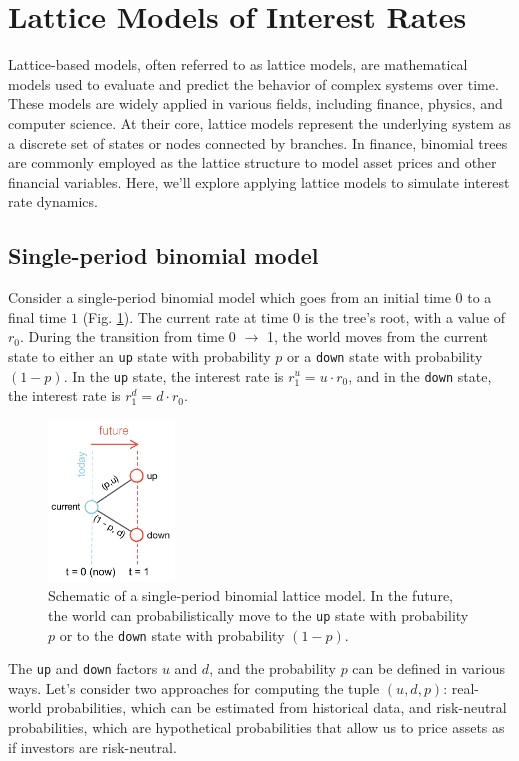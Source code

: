 \documentclass[11pt]{article}
\theoremstyle{definition}
\begin{document}
\clearpage

\section{Lattice Models of Interest Rates}
Lattice-based models, often referred to as lattice models, are mathematical models used to evaluate and predict the behavior of complex systems over time. 
These models are widely applied in various fields, including finance, physics, and computer science. 
At their core, lattice models represent the underlying system as a discrete set of states or nodes connected by branches. In finance, binomial trees are commonly employed as the lattice structure to model asset prices and other financial variables. Here, we'll explore applying lattice models to simulate interest rate dynamics. 

\subsection{Single-period binomial model}
Consider a single-period binomial model which goes from an initial time $0$ to a final time $1$ (Fig. \ref{fig:example-oneste-binomial-lattice-schematic}).
The current rate at time $0$ is the tree's root, with a value of $r_{0}$.
During the transition from time 0 $\rightarrow$ 1, the world moves 
from the current state to either an \texttt{up} state with probability $p$ or a \texttt{down} state with probability $(1-p)$.
In the \texttt{up} state, the interest rate is $r_{1}^{u} = u\cdot{r_{0}}$, 
and in the \texttt{down} state, the interest rate is $r_{1}^{d} = d\cdot{r_{0}}$.
\begin{figure}[h]
    \centering
    \includegraphics[width=0.30\textwidth]{./figs/Fig-OneStep-Binomial-Lattice-Schematic.pdf}
    \caption{Schematic of a single-period binomial lattice model. 
	In the future, the world can probabilistically move to the \texttt{up} state with probability $p$ or to the \texttt{down} state with probability $(1-p)$. 
	}\label{fig:example-oneste-binomial-lattice-schematic}
\end{figure}
The \texttt{up} and \texttt{down} factors $u$ and $d$, and the probability $p$ can be defined in various ways.  
Let's consider two approaches for computing the tuple $(u,d,p)$: real-world probabilities, which can be estimated from historical data, and risk-neutral probabilities, 
which are hypothetical probabilities that allow us to price assets as if investors are risk-neutral. 
\end{document}
